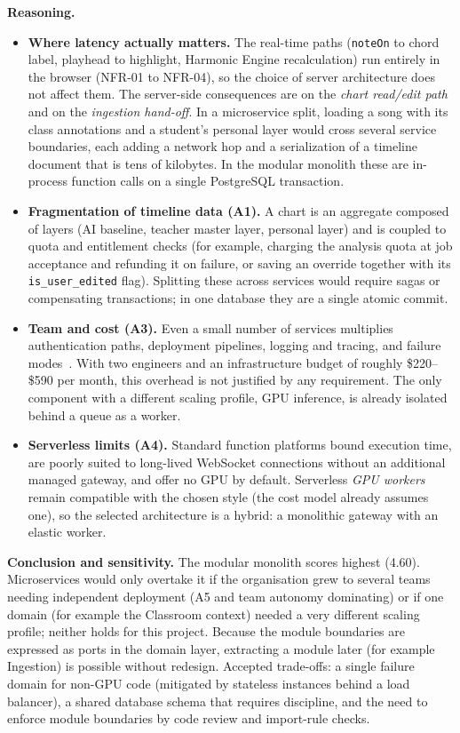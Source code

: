 \documentclass[a4paper]{article}
\begin{document}
\textbf{Reasoning.}
\begin{itemize}
    \item \textbf{Where latency actually matters.} The real-time paths (\texttt{noteOn} to chord label, playhead to highlight, Harmonic Engine recalculation) run entirely in the browser (NFR-01 to NFR-04), so the choice of server architecture does not affect them. The server-side consequences are on the \emph{chart read/edit path} and on the \emph{ingestion hand-off}. In a microservice split, loading a song with its class annotations and a student's personal layer would cross several service boundaries, each adding a network hop and a serialization of a timeline document that is tens of kilobytes. In the modular monolith these are in-process function calls on a single PostgreSQL transaction.
    \item \textbf{Fragmentation of timeline data (A1).} A chart is an aggregate composed of layers (AI baseline, teacher master layer, personal layer) and is coupled to quota and entitlement checks (for example, charging the analysis quota at job acceptance and refunding it on failure, or saving an override together with its \texttt{is\_user\_edited} flag). Splitting these across services would require sagas or compensating transactions; in one database they are a single atomic commit.
    \item \textbf{Team and cost (A3).} Even a small number of services multiplies authentication paths, deployment pipelines, logging and tracing, and failure modes~\cite{modular_monolith_blog}. With two engineers and an infrastructure budget of roughly \$220--\$590 per month, this overhead is not justified by any requirement. The only component with a different scaling profile, GPU inference, is already isolated behind a queue as a worker.
    \item \textbf{Serverless limits (A4).} Standard function platforms bound execution time, are poorly suited to long-lived WebSocket connections without an additional managed gateway, and offer no GPU by default. Serverless \emph{GPU workers} remain compatible with the chosen style (the cost model already assumes one), so the selected architecture is a hybrid: a monolithic gateway with an elastic worker.
\end{itemize}

\textbf{Conclusion and sensitivity.} The modular monolith scores highest (4.60). Microservices would only overtake it if the organisation grew to several teams needing independent deployment (A5 and team autonomy dominating) or if one domain (for example the Classroom context) needed a very different scaling profile; neither holds for this project. Because the module boundaries are expressed as ports in the domain layer, extracting a module later (for example Ingestion) is possible without redesign. Accepted trade-offs: a single failure domain for non-GPU code (mitigated by stateless instances behind a load balancer), a shared database schema that requires discipline, and the need to enforce module boundaries by code review and import-rule checks.
\end{document}
